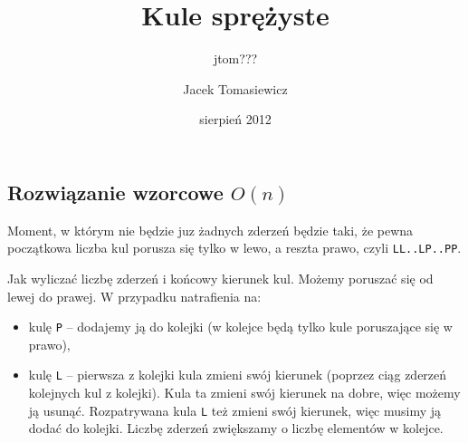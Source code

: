 \documentclass[zad, zawodnik, utf8]{sinol}
\newcounter{def}
\newcounter{tw}
\newcounter{lem}
\newcounter{wn}
\newcounter{obs}
\begin{document}
 \signature{jtom???}
  \pagestyle{fancy}
  \title{Kule sprężyste}
  \author{Jacek Tomasiewicz}
  \day{}
  \date{sierpień 2012}


\begin{tasktext}%

\setcounter{def}{1}
\setcounter{tw}{1}
\setcounter{wn}{1}
\setcounter{obs}{1}

\section{Rozwiązanie wzorcowe $O(n)$}

Moment, w którym nie będzie juz żadnych zderzeń będzie taki, że pewna początkowa liczba kul porusza się tylko w lewo, a reszta prawo, czyli \texttt{LL..LP..PP}.

Jak wyliczać liczbę zderzeń i końcowy kierunek kul. Możemy poruszać się od lewej do prawej. W przypadku natrafienia na:
\begin{itemize}
\item kulę \texttt{P} -- dodajemy ją do kolejki (w kolejce będą tylko kule poruszające się w prawo),
\item kulę \texttt{L} -- pierwsza z kolejki kula zmieni swój kierunek (poprzez ciąg zderzeń kolejnych kul z kolejki). Kula ta zmieni swój kierunek na dobre, więc możemy ją usunąć. Rozpatrywana kula \texttt{L} też zmieni swój kierunek, więc musimy ją dodać do kolejki. Liczbę zderzeń zwiększamy o liczbę elementów w kolejce.
\end{itemize}

\end{tasktext}
\end{document}
